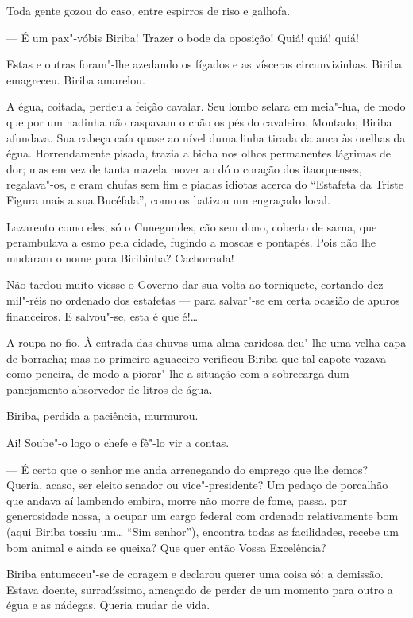 Toda gente gozou do caso, entre espirros de riso e galhofa.

--- É um pax"-vóbis Biriba! Trazer o bode da oposição! Quiá! quiá! quiá!

Estas e outras foram"-lhe azedando os fígados e as vísceras
circunvizinhas. Biriba emagreceu. Biriba amarelou.

A égua, coitada, perdeu a feição cavalar. Seu lombo selara em meia"-lua,
de modo que por um nadinha não raspavam o chão os pés do cavaleiro.
Montado, Biriba afundava. Sua cabeça caía quase ao nível duma linha
tirada da anca às orelhas da égua. Horrendamente pisada, trazia a bicha
nos olhos permanentes lágrimas de dor; mas em vez de tanta mazela mover
ao dó o coração dos itaoquenses, regalava"-os, e eram chufas sem fim e
piadas idiotas acerca do ``Estafeta da Triste Figura mais a sua
Bucéfala'', como os batizou um engraçado local.

Lazarento como eles, só o Cunegundes, cão sem dono, coberto de sarna,
que perambulava a esmo pela cidade, fugindo a moscas e pontapés. Pois
não lhe mudaram o nome para Biribinha? Cachorrada!

Não tardou muito viesse o Governo dar sua volta ao torniquete, cortando
dez mil"-réis no ordenado dos estafetas --- para salvar"-se em certa
ocasião de apuros financeiros. E salvou"-se, esta é que é!\ldots{}

A roupa no fio. À entrada das chuvas uma alma caridosa deu"-lhe uma velha
capa de borracha; mas no primeiro aguaceiro verificou Biriba que tal
capote vazava como peneira, de modo a piorar"-lhe a situação com a
sobrecarga dum panejamento absorvedor de litros de água.

Biriba, perdida a paciência, murmurou.

Ai! Soube"-o logo o chefe e fê"-lo vir a contas.

--- É certo que o senhor me anda arrenegando do emprego que lhe demos?
Queria, acaso, ser eleito senador ou vice"-presidente? Um pedaço de
porcalhão que andava aí lambendo embira, morre não morre de fome, passa,
por generosidade nossa, a ocupar um cargo federal com ordenado
relativamente bom (aqui Biriba tossiu um\ldots{} ``Sim senhor''), encontra
todas as facilidades, recebe um bom animal e ainda se queixa? Que quer
então Vossa Excelência?

Biriba entumeceu"-se de coragem e declarou querer uma coisa só: a
demissão. Estava doente, surradíssimo, ameaçado de perder de um momento
para outro a égua e as nádegas. Queria mudar de vida.

